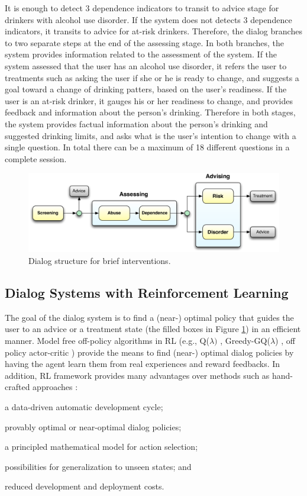 \documentclass[letterpaper]{article}
\begin{document}
It is enough to detect 3 dependence indicators to transit to advice stage 
for drinkers with alcohol use disorder.  If the system does not detects 3 dependence 
indicators, it transits to advice for at-risk drinkers. Therefore, the dialog branches to two 
separate steps at the end of the assessing stage. In both branches, the system provides information 
related to the assessment of the system.  If the system assessed that the user has an alcohol use 
disorder, it refers the user to treatments such as asking  the user if she or he is ready to 
change, and suggests a goal toward a change of drinking patters, based on the user's readiness. If 
the user is an at-risk drinker, it gauges his or her readiness to change, and provides feedback and 
information about the person's drinking. Therefore in both stages, the system provides factual 
information about the person's drinking and suggested drinking limits, and asks what is the user's 
intention to change with a single question.  In total there can be a maximum of 18 different 
questions in a complete session.   

\begin{figure}[!t] 
\centering 
\includegraphics[width=.49\textwidth]{figures/dialog_manager_v2} 
\caption{Dialog structure for brief interventions.} 
\label{fig:dialog_manager} 
\end{figure}

\subsection*{Dialog Systems with Reinforcement Learning}

The goal of the dialog system is to find a (near-) optimal policy that guides the user to an advice 
or a treatment state (the filled boxes in Figure \ref{fig:dialog_manager}) in an efficient manner. 
Model free off-policy algorithms in RL (e.g., Q($\lambda)$ \cite{sutton1998reinforcement}, 
Greedy-GQ($\lambda$) \cite{maei2010toward}, off policy actor-critic \cite{DegrisWS12}) provide the 
means to find (near-) optimal dialog  policies by having the agent learn them 
from real experiences and reward feedbacks. In addition, RL framework provides many advantages over 
methods such as hand-crafted approaches \cite{lemon2007machine}: \begin{inparaenum}[1)] \item a 
data-driven automatic development cycle; \item provably optimal or near-optimal dialog policies; 
\item  a principled mathematical model for action selection; \item  possibilities for generalization 
to unseen states; and \item reduced development and deployment costs.\end{inparaenum} 
\end{document}
